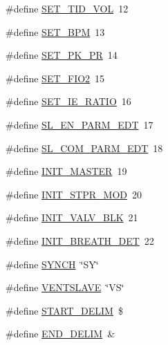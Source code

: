 \begin{DoxyCompactItemize}
\item 
\#define \hyperlink{group___state_control_module_ga0741496c0ac7c16254b6420779edaac0}{S\+E\+T\+\_\+\+T\+I\+D\+\_\+\+V\+OL}~12
\item 
\#define \hyperlink{group___state_control_module_gaa883895aa6e031109476683c2765a2f7}{S\+E\+T\+\_\+\+B\+PM}~13
\item 
\#define \hyperlink{group___state_control_module_ga777447137ff930b3182ce5b38f6fa52a}{S\+E\+T\+\_\+\+P\+K\+\_\+\+PR}~14
\item 
\#define \hyperlink{group___state_control_module_ga9756af06bb17a1db92bac2ca2b9e810e}{S\+E\+T\+\_\+\+F\+I\+O2}~15
\item 
\#define \hyperlink{group___state_control_module_ga3d17781cd0bcfb9bd8dc20bae6e46897}{S\+E\+T\+\_\+\+I\+E\+\_\+\+R\+A\+T\+IO}~16
\item 
\#define \hyperlink{group___state_control_module_ga95bebe1d169286beb8feb6b794118cb8}{S\+L\+\_\+\+E\+N\+\_\+\+P\+A\+R\+M\+\_\+\+E\+DT}~17
\item 
\#define \hyperlink{group___state_control_module_gab1a45d1a9a1ff653590689e368a6673c}{S\+L\+\_\+\+C\+O\+M\+\_\+\+P\+A\+R\+M\+\_\+\+E\+DT}~18
\item 
\#define \hyperlink{group___state_control_module_gabf46fee01f15d3064a969d2496d6655a}{I\+N\+I\+T\+\_\+\+M\+A\+S\+T\+ER}~19
\item 
\#define \hyperlink{group___state_control_module_ga96c1e48c41f357114f5bce0a09796337}{I\+N\+I\+T\+\_\+\+S\+T\+P\+R\+\_\+\+M\+OD}~20
\item 
\#define \hyperlink{group___state_control_module_ga6af9fc492439787640378141282553c0}{I\+N\+I\+T\+\_\+\+V\+A\+L\+V\+\_\+\+B\+LK}~21
\item 
\#define \hyperlink{group___state_control_module_ga1bb22977fa0d1fc45b3c9d20f66929dc}{I\+N\+I\+T\+\_\+\+B\+R\+E\+A\+T\+H\+\_\+\+D\+ET}~22
\item 
\#define \hyperlink{group___state_control_module_ga2693cd3c8d4a8c6bca560e631dc84f73}{S\+Y\+N\+CH}~\char`\"{}SY\char`\"{}
\item 
\#define \hyperlink{group___state_control_module_ga094c380bc7b252c380fe99f9f1f3a40c}{V\+E\+N\+T\+S\+L\+A\+VE}~\char`\"{}VS\char`\"{}
\item 
\#define \hyperlink{group___state_control_module_ga4cf9fc60e700d5bc03cdeea67200e710}{S\+T\+A\+R\+T\+\_\+\+D\+E\+L\+IM}~\textquotesingle{}\$\textquotesingle{}
\item 
\#define \hyperlink{group___state_control_module_ga2d0042b493e420e415586e0ed3e6159b}{E\+N\+D\+\_\+\+D\+E\+L\+IM}~\textquotesingle{}\&\textquotesingle{}

\end{DoxyCompactItemize}
